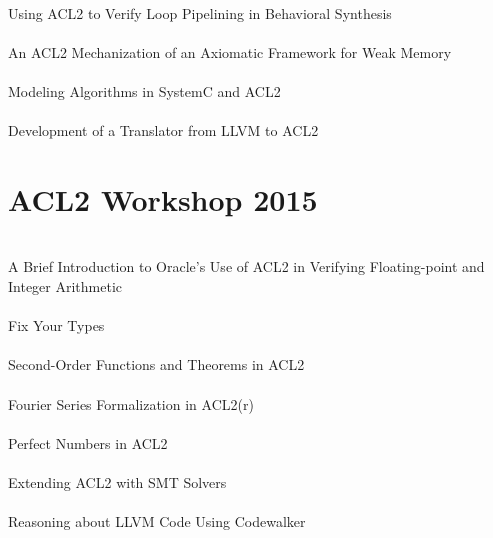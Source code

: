 \documentclass{article}
\begin{document}
\cite{14-puri-pipelining} \\
Using {ACL2} to Verify Loop Pipelining in Behavioral Synthesis \\

\cite{14-selfridge} \\
An {ACL2} Mechanization of an Axiomatic Framework for Weak Memory \\

\cite{14-oleary-systemc} \\
Modeling Algorithms in {SystemC} and {ACL2} \\

\cite{14-hardin-llvm} \\
Development of a Translator from {LLVM} to {ACL2} \\


\section{ACL2 Workshop 2015}

\cite{15-rager-fp} \\
A Brief Introduction to {Oracle}'s Use of {ACL2} in Verifying Floating-point and Integer Arithmetic \\

\cite{15-swords-fty} \\
Fix Your Types \\

\cite{15-coglio-soft} \\
Second-Order Functions and Theorems in {ACL2} \\

\cite{15-chau-fourier} \\
{Fourier} Series Formalization in {ACL2(r)} \\

\cite{15-cowles-perfect} \\
Perfect Numbers in {ACL2} \\

\cite{15-peng-smt} \\
Extending {ACL2} with {SMT} Solvers \\

\cite{15-hardin-llvm} \\
Reasoning about {LLVM} Code Using {Codewalker} \\
\end{document}
